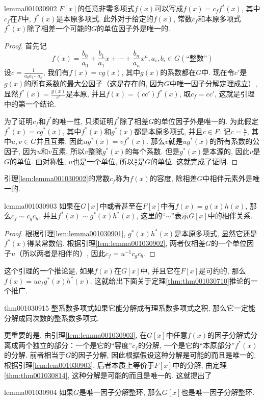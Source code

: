 \begin{lemma}{}{lemma001030902}
$F[x]$的任意非零多项式$f(x)$可以写成$f(x)=c_ff^*(x)$, 其中$c_f$在$F$中, $f^*(x)$是本原多项式. 此外对于给定的$f(x)$, 常数$c_f$和本原多项式$f^*(x)$除了相差一个可能的$G$的单位因子外是唯一的. 
\end{lemma}

\begin{proof}
首先记
\[
f(x)=\frac{b_0}{a_0} + \frac{b_1}{a_1}x + \cdots + \frac{b_n}{a_n}x^n, a_i, b_i \in G(\text{“整数”})
\]
设$c = \frac{1}{a_0a_1\cdots{}a_n}$, 我们有$f(x)=cg(x)$, 其中$g(x)$的系数都在$G$中. 现在令$c'$是$g(x)$的所有系数的最大公因子（这是存在的, 因为$G$中唯一因子分解定理成立）, 显然$f^*(x)=\frac{g(x)}{c'}$是本原, 并且$f(x)=(cc')f^*(x)$, 取$c_f=cc'$, 这就是引理中的第一个结论. 

为了证明$c_f$和$f^*$的唯一性, 只须证明$f^*$除了相差$G$的单位因子外是唯一的. 为此假定$f^*(x)=cg^*(x)$, 其中$f^*(x)$和$g^*(x)$都是本原多项式, 并且$c \in F$. 记$c = \frac{u}{v}$, 其中$u, v \in G$并且互素, 因此$ug^*(x)=vf^*(x)$. 那么$v$就是$ug^*(x)$的所有系数的公因子, 因为$u$和$v$互素, 所以$v$整除$g^*(x)$的每个系数. 但是$g^*(x)$是本源的, 因此$v$是$G$的单位. 由对称性, $u$也是一个单位, 所以$\frac{u}{v}$是$G$的单位. 这就完成了证明. 
\end{proof}

引理\ref{lem:lemma001030902}的常数$c_f$称为$f(x)$的容度, 除相差$G$中相伴元素外是唯一的. 

\begin{lemma}{}{lemma001030903}
如果在$G[x]$中或者甚至在$F[x]$中有$f(x)=g(x)h(x)$, 那么$c_f \sim c_gc_h$, 并且$f^*(x) \sim g^*(x)h^*(x)$, 这里的“$\sim$”表示$G[x]$中的相伴关系. 
\end{lemma}

\begin{proof}
根据引理\ref{lem:lemma001030901}, $g^*(x)h^*(x)$是本原多项式, 显然它还是$f^*(x)$得某常数倍. 根据引理\ref{lem:lemma001030902}, 两者仅相差$G$的一个单位因子$u$（所以两者是相伴的）, 因此$c_f = u^{-1}c_gc_h$. 
\end{proof}

这个引理的一个推论是, 如果$f(x)$在$G[x]$中, 并且它在$F[x]$是可约的, 那么$f(x)=uc_fg^*(x)h^*(x)$. 这就给出下面关于定理\ref{thm:thm001030710}推论的一个推广. 
\begin{theorem}{}{thm001030915}
整系数多项式如果它能分解成有理系数多项式之积, 那么它一定能分解成同次数的整系数多项式. 
\end{theorem}

更重要的是, 由引理\ref{lem:lemma001030903}, 在$G[x]$中任意$f(x)$的因子分解式分离成两个独立的部分：一个是它的“容度”$c_f$的分解, 一个是它的“本原部分”$f^*(x)$的分解. 前者相当于$G$的因子分解, 因此根据假设这种分解是可能的而且是唯一的. 根据引理\ref{lem:lem001030903}, 后者本质上等价于$F[x]$中的分解, 由定理\ref{thm:thm001030814}, 这种分解是可能的而且是唯一的. 这就提出了
\begin{lemma}{}{lemma001030904}
如果$G$是唯一因子分解整环, 那么$G[x]$也是唯一因子分解整环. 
\end{lemma}

